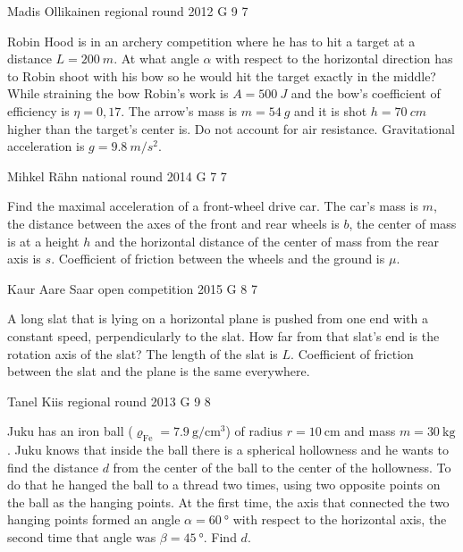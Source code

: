 \documentclass[11pt]{article}
\begin{document}
{Madis Ollikainen} %
{regional round} %
{2012} %
{G 9} %
{7} %
{

\ifEngStatement
Robin Hood is in an archery competition where he has to hit a target at a distance $L=\SI{200}{m}$. At what angle $\alpha$ with respect to the horizontal direction has to Robin shoot with his bow so he would hit the target exactly in the middle? While straining the bow Robin’s work is $A=\SI{500}{J}$ and the bow’s coefficient of efficiency is $\eta=0,17$. The arrow’s mass is $m=\SI{54}{g}$ and it is shot $h=\SI{70}{cm}$ higher than the target’s center is. Do not account for air resistance. Gravitational acceleration is $g=\SI{9,8}{m/s^2}$.
\fi
}

{Mihkel Rähn} %
{national round} %
{2014} %
{G 7} %
{7} %
{

\ifEngStatement
Find the maximal acceleration of a front-wheel drive car. The car’s mass is $m$, the distance between the axes of the front and rear wheels is $b$, the center of mass is at a height $h$ and the horizontal distance of the center of mass from the rear axis is $s$. Coefficient of friction between the wheels and the ground is $\mu$.
\fi
}

{Kaur Aare Saar} %
{open competition} %
{2015} %
{G 8} %
{7} %
{

\ifEngStatement
A long slat that is lying on a horizontal plane is pushed from one end with a constant speed, perpendicularly to the slat. How far from that slat’s end is the rotation axis of the slat? The length of the slat is $L$. Coefficient of friction between the slat and the plane is the same everywhere.
\fi
}

{Tanel Kiis} %
{regional round} %
{2013} %
{G 9} %
{8} %
{

\ifEngStatement
Juku has an iron ball ($\varrho_\mathrm{Fe}=\SI{7,9}{\gram\per\centi\meter\cubed}$) of radius $r=\SI{10}{\centi\meter}$ and mass $m=\SI{30}{\kilo\gram}$. Juku knows that inside the ball there is a spherical hollowness and he wants to find the distance $d$ from the center of the ball to the center of the hollowness. To do that he hanged the ball to a thread two times, using two opposite points on the ball as the hanging points. At the first time, the axis that connected the two hanging points formed an angle $\alpha=\SI{60}{\degree}$ with respect to the horizontal axis, the second time that angle was $\beta=\SI{45}{\degree}$. Find $d$.
\fi
}
\end{document}
